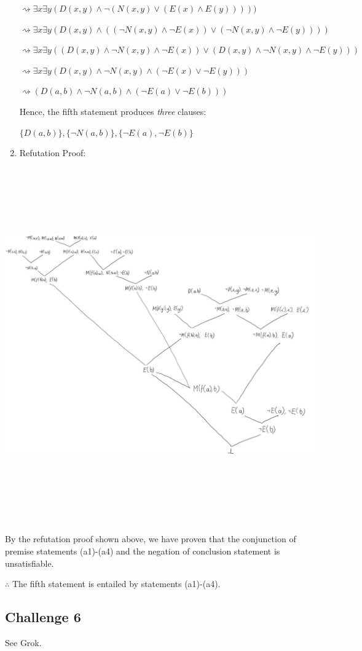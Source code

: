 \documentclass[12pt]{article}
\begin{document}
\begin{enumerate}
$\rightsquigarrow \exists x \exists y(D(x,y) \land \neg (N(x,y) \lor (E(x) \land E(y)))))$

$\rightsquigarrow \exists x \exists y(D(x,y) \land ((\neg N(x,y) \land \neg E(x)) \lor (\neg N(x,y) \land \neg E(y))))$

$\rightsquigarrow \exists x \exists y((D(x,y) \land \neg N(x,y) \land \neg E(x)) \lor (D(x,y) \land \neg N(x,y) \land \neg E(y)))$

$\rightsquigarrow \exists x \exists y(D(x,y) \land \neg N(x,y) \land (\neg E(x) \lor \neg E(y)))$

$\rightsquigarrow (D(a,b) \land \neg N(a,b) \land (\neg E(a) \lor \neg E(b)))$

\bigskip
Hence, the fifth statement produces \emph{three} clauses:

$\{D(a,b)\}, \{\neg N(a,b)\}, \{\neg E(a), \neg E(b)\}$

\bigskip
\item Refutation Proof:
\end{enumerate}

\begin{center}
\includegraphics[width=7in,height=6in,keepaspectratio]{q5_refutation.jpg}
\end{center}

\bigskip
\noindent
By the refutation proof shown above, we have proven that the conjunction of
premise statements (a1)-(a4) and the negation of conclusion statement is
unsatisfiable.
\bigskip
\noindent

$\therefore$ The fifth statement is entailed by statements (a1)-(a4).

\subsection*{Challenge 6}
See Grok.
\end{document}
